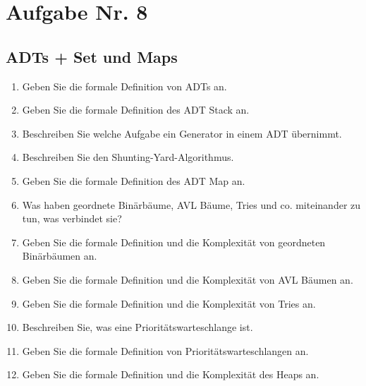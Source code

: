 \documentclass[12px,a4paper]{article}
\begin{document}
\section*{Aufgabe Nr. 8}
\subsection*{ADTs + Set und Maps}
\begin{enumerate}
	\item Geben Sie die formale Definition von ADTs an.
	\item Geben Sie die formale Definition des ADT Stack an.
	\item Beschreiben Sie welche Aufgabe ein Generator in einem ADT übernimmt.
	\item Beschreiben Sie den Shunting-Yard-Algorithmus.
	\item Geben Sie die formale Definition des ADT Map an.
	\item Was haben geordnete Binärbäume, AVL Bäume, Tries und co. miteinander zu tun, was verbindet sie?
	\item Geben Sie die formale Definition und die Komplexität von geordneten Binärbäumen an.
	\item Geben Sie die formale Definition und die Komplexität von AVL Bäumen an.
	\item Geben Sie die formale Definition und die Komplexität von Tries an.
	\item Beschreiben Sie, was eine Prioritätswarteschlange ist. 
	\item Geben Sie die formale Definition von Prioritätswarteschlangen an.
	\item Geben Sie die formale Definition und die Komplexität des Heaps an.
\end{enumerate}
\end{document}
